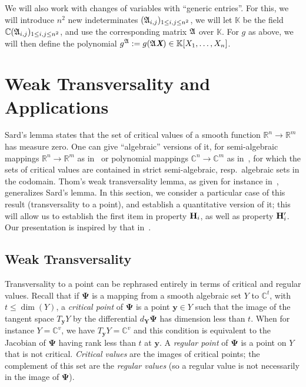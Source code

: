 \documentclass[sigconf]{acmart}
\def\Xb{\textit{\textbf{X}}}
\def\fA{{\frak A}}
\def\C{\mathbb{C}}
\def\R{\mathbb{R}}
\def\K{\mathbb{K}}
\begin{document}
We will also work with changes of variables with ``generic entries''.
For this, we will introduce $n^2$ new indeterminates $(\frak
A_{i,j})_{1\le i,j \le n^2}$, we will let $\K$ be the field $\C(\frak
A_{i,j})_{1\le i,j \le n^2}$, and use the corresponding matrix $ \fA$
over $\K$. For $g$ as above, we will then define the polynomial 
$g^\fA:=g(\fA \Xb) \in \K[X_1,\dots,X_n]$.



\section{Weak Transversality and Applications}

Sard's lemma states that the set of critical values of a smooth
function $\R^n \to \R^m$ has measure zero. One can give ``algebraic''
versions of it, for semi-algebraic mappings $\R^n \to \R^m$ as
in~\cite[Chapter~9]{bochnak1998real} or polynomial mappings $\C^n \to
\C^m$ as in~\cite[Chapter~3]{Mumford76}, for which the sets of
critical values are contained in strict semi-algebraic,
resp.\ algebraic sets in the codomain. Thom's weak transversality
lemma, as given for instance in~\cite{demazure2000bifurcations},
generalizes Sard's lemma. In this section, we consider a particular
case of this result (transversality to a point), and establish a
quantitative version of it; this will allow us to establish the first
item in property ${\bf H}_i$, as well as property ${\bf H}'_i$. Our
presentation is inspired by that in~\cite{TWT}.



\subsection{Weak Transversality}

Transversality to a point can be rephrased entirely in terms of
critical and regular values. Recall that if $\bm \Psi$ is a mapping
from a smooth algebraic set $Y$ to $\C^t$, with $t\le \dim(Y)$, a {\em
  critical point} of $\bm \Psi$ is a point $\bm y \in Y$ such that the
image of the tangent space $T_{\bm y} Y$ by the differential $d_{\bm
  Y} \bm \Psi$ has dimension less than $t$. When for instance
$Y=\C^v$, we have $T_{\bm y} Y=\C^v$ and this condition is equivalent
to the Jacobian of $\bm \Psi$ having rank less than $t$ at $\bm y$.  A
{\em regular point} of $\bm \Psi$ is a point on $Y$ that is not
critical. {\em Critical values} are the images of critical points; the
complement of this set are the {\em regular values} (so a regular
value is not necessarily in the image of $\bm\Psi$).
\end{document}
